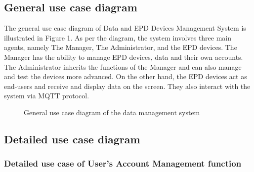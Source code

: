 \documentclass[../Main.tex]{subfiles}
\begin{document}
\subsection{General use case diagram}
\label{subsection:2.2.1}
The general use case diagram of Data and EPD Devices Management System is illustrated in Figure 1. As per the diagram, the system involves three main agents, namely The Manager, The Administrator, and the EPD devices. The Manager has the ability to manage EPD devices, data and their own accounts. The Administrator inherits the functions of the Manager and can also manage and test the devices more advanced. On the other hand, the EPD devices act as end-users and receive and display data on the screen. They also interact with the system via MQTT protocol.
\begin{figure}[htbp]
    \centering
    \caption{General use case diagram of the data management system}
    \label{fig:usecasediagram}
\end{figure}

\subsection{Detailed use case diagram}
\label{subsection:2.2.2}

\subsubsection{Detailed use case of User's Account Management function}
\end{document}
